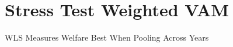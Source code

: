 \documentclass[t,aspectratio=169,11pt]{beamer}
\begin{document}
\section{Stress Test Weighted VAM}



\begin{frame}{WLS Measures Welfare Best When Pooling Across Years}
\vfill


\end{frame}
\end{document}
